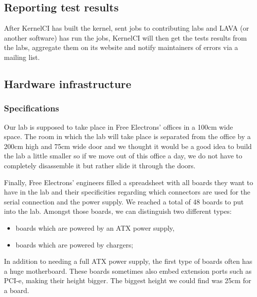 \subsection{Reporting test results}

After KernelCI has built the kernel, sent jobs to contributing labs and LAVA (or another software) has run the jobs, KernelCI will then get the tests results from the labs, aggregate them on its website and notify maintainers of errors via a mailing list.

\subsection{Hardware infrastructure}

\subsubsection{Specifications}

Our lab is supposed to take place in Free Electrons' offices in a 100cm wide space. The room in which the lab will take place is separated from the office by a 200cm high and 75cm wide door and we thought it would be a good idea to build the lab a little smaller so if we move out of this office a day, we do not have to completely disassemble it but rather slide it through the doors.

Finally, Free Electrons' engineers filled a spreadsheet with all boards they want to have in the lab and their specificities regarding which connectors are used for the serial connection and the power supply. We reached a total of 48 boards to put into the lab. Amongst those boards, we can distinguish two different types:
\begin{itemize}
  \item boards which are powered by an ATX power supply,
  \item boards which are powered by chargers;
\end{itemize}

In addition to needing a full ATX power supply, the first type of boards often has a huge motherboard. These boards sometimes also embed extension ports such as PCI-e, making their height bigger. The biggest height we could find was 25cm for a board.

